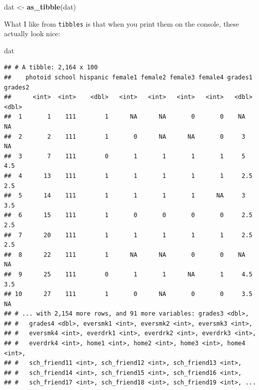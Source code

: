 \documentclass[]{book}
\newenvironment{Shaded}{\begin{snugshade}}{\end{snugshade}}
\newcommand{\KeywordTok}[1]{\textcolor[rgb]{0.13,0.29,0.53}{\textbf{#1}}}
\newcommand{\NormalTok}[1]{#1}
\newcommand{\StringTok}[1]{\textcolor[rgb]{0.31,0.60,0.02}{#1}}
\begin{document}
\begin{Shaded}
\begin{Highlighting}[]
\NormalTok{dat <-}\StringTok{ }\KeywordTok{as_tibble}\NormalTok{(dat)}
\end{Highlighting}
\end{Shaded}

What I like from \texttt{tibbles} is that when you print them on the console, these actually look nice:

\begin{Shaded}
\begin{Highlighting}[]
\NormalTok{dat}
\end{Highlighting}
\end{Shaded}

\begin{verbatim}
## # A tibble: 2,164 x 100
##    photoid school hispanic female1 female2 female3 female4 grades1 grades2
##      <int>  <int>    <dbl>   <int>   <int>   <int>   <int>   <dbl>   <dbl>
##  1       1    111        1      NA      NA       0       0    NA      NA  
##  2       2    111        1       0      NA      NA       0     3      NA  
##  3       7    111        0       1       1       1       1     5       4.5
##  4      13    111        1       1       1       1       1     2.5     2.5
##  5      14    111        1       1       1       1      NA     3       3.5
##  6      15    111        1       0       0       0       0     2.5     2.5
##  7      20    111        1       1       1       1       1     2.5     2.5
##  8      22    111        1      NA      NA       0       0    NA      NA  
##  9      25    111        0       1       1      NA       1     4.5     3.5
## 10      27    111        1       0      NA       0       0     3.5    NA  
## # ... with 2,154 more rows, and 91 more variables: grades3 <dbl>,
## #   grades4 <dbl>, eversmk1 <int>, eversmk2 <int>, eversmk3 <int>,
## #   eversmk4 <int>, everdrk1 <int>, everdrk2 <int>, everdrk3 <int>,
## #   everdrk4 <int>, home1 <int>, home2 <int>, home3 <int>, home4 <int>,
## #   sch_friend11 <int>, sch_friend12 <int>, sch_friend13 <int>,
## #   sch_friend14 <int>, sch_friend15 <int>, sch_friend16 <int>,
## #   sch_friend17 <int>, sch_friend18 <int>, sch_friend19 <int>, ...
\end{verbatim}
\end{document}
